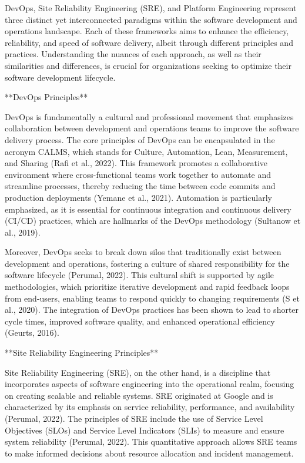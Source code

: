 DevOps, Site Reliability Engineering (SRE), and Platform Engineering represent three distinct yet interconnected paradigms within the software development and operations landscape. Each of these frameworks aims to enhance the efficiency, reliability, and speed of software delivery, albeit through different principles and practices. Understanding the nuances of each approach, as well as their similarities and differences, is crucial for organizations seeking to optimize their software development lifecycle.

**DevOps Principles**

DevOps is fundamentally a cultural and professional movement that emphasizes collaboration between development and operations teams to improve the software delivery process. The core principles of DevOps can be encapsulated in the acronym CALMS, which stands for Culture, Automation, Lean, Measurement, and Sharing (Rafi et al., 2022). This framework promotes a collaborative environment where cross-functional teams work together to automate and streamline processes, thereby reducing the time between code commits and production deployments (Yemane et al., 2021). Automation is particularly emphasized, as it is essential for continuous integration and continuous delivery (CI/CD) practices, which are hallmarks of the DevOps methodology (Sultanow et al., 2019).

Moreover, DevOps seeks to break down silos that traditionally exist between development and operations, fostering a culture of shared responsibility for the software lifecycle (Perumal, 2022). This cultural shift is supported by agile methodologies, which prioritize iterative development and rapid feedback loops from end-users, enabling teams to respond quickly to changing requirements (S et al., 2020). The integration of DevOps practices has been shown to lead to shorter cycle times, improved software quality, and enhanced operational efficiency (Geurts, 2016).

**Site Reliability Engineering Principles**

Site Reliability Engineering (SRE), on the other hand, is a discipline that incorporates aspects of software engineering into the operational realm, focusing on creating scalable and reliable systems. SRE originated at Google and is characterized by its emphasis on service reliability, performance, and availability (Perumal, 2022). The principles of SRE include the use of Service Level Objectives (SLOs) and Service Level Indicators (SLIs) to measure and ensure system reliability (Perumal, 2022). This quantitative approach allows SRE teams to make informed decisions about resource allocation and incident management.


